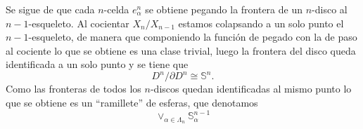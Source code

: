Se sigue de que cada $n$-celda $e_{\alpha}^n$ se obtiene pegando la frontera de un $n$-disco al $n-1$-esqueleto. Al cocientar $X_n/X_{n-1}$ estamos colapsando a un solo punto el $n-1$-esqueleto, de manera que componiendo la función de pegado con la de paso al cociente lo que se obtiene es una clase trivial, luego la frontera del disco queda identificada a un solo punto y se tiene que 
\begin{equation*}
    D^n/\partial D^n \cong \mathbb{S}^n.
\end{equation*}
Como las fronteras de todos los  $n$-discos quedan identificadas al mismo punto lo que se obtiene es un ``ramillete'' de esferas, que denotamos
\begin{equation*}
    \vee_{\alpha\in\Lambda_n} \mathbb{S}^{n-1}_{\alpha}
\end{equation*}